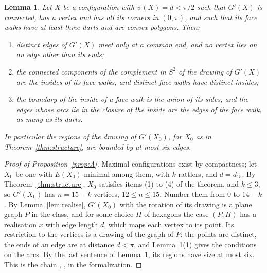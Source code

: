 \documentclass[12pt]{amsart}
\newtheorem{lemma}[theorem]{Lemma}
\theoremstyle{definition}
\theoremstyle{plain}
\theoremstyle{definition}
\newcommand{\Sph}{S^2}
\newcommand{\leanmap}[1]{\ignorespaces}
\newcommand{\mapnote}[1]{\ignorespaces}
\begin{document}
\begin{lemma}\label{lem:regions}\leanmap{Tammes15.D2Regions.regions_eq_facePolygons, Tammes15.D2Regions.isArcDrawing_of_contact, Tammes15.D2Regions.planeClass_of_structured, Tammes15.D2Regions.IsArcDrawing, Tammes15.D2Regions.IsRegion, Tammes15.D2Regions.Bounds, Tammes15.D2Regions.regionSize, Tammes15.D2Regions.facePolygon}\mapnote{for the vertex set of $G'(X)$, whose contact graph is $G'(X)$; the last sentence is the third declaration}
Let $X$ be a configuration with $\psi(X)=d<\pi/2$ such that $G'(X)$ is connected, has a vertex and has all its corners in $(0,\pi)$, and such that its face walks have at least three darts and are convex polygons. Then:
\begin{enumerate}
\item distinct edges of $G'(X)$ meet only at a common end, and no vertex lies on an edge other than its ends;
\item the connected components of the complement in $\Sph$ of the drawing of $G'(X)$ are the insides of its face walks, and distinct face walks have distinct insides;
\item the boundary of the inside of a face walk is the union of its sides, and the edges whose arcs lie in the closure of the inside are the edges of the face walk, as many as its darts.
\end{enumerate}
In particular the regions of the drawing of $G'(X_0)$, for $X_0$ as in Theorem~\ref{thm:structure}, are bounded by at most six edges.
\end{lemma}

\begin{proof}[Proof of Proposition~\ref{prop:A}]
Maximal configurations exist by compactness; let $X_0$ be one with $E(X_0)$ minimal among them, with $k$ rattlers, and $d=d_{15}$. By Theorem~\ref{thm:structure}, $X_0$ satisfies items (1) to (4) of the theorem, and $k\le3$, so $G'(X_0)$ has $n=15-k$ vertices, $12\le n\le15$. Number them from $0$ to $14-k$. By Lemma~\ref{lem:realise}, $G'(X_0)$ with the rotation of its drawing is a plane graph $P$ in the class, and for some choice $H$ of hexagons the case $(P,H)$ has a realisation $x$ with edge length $d$, which maps each vertex to its point. Its restriction to the vertices is a drawing of the graph of $P$: the points are distinct, the ends of an edge are at distance $d<\pi$, and Lemma~\ref{lem:regions}(1) gives the conditions on the arcs. By the last sentence of Lemma~\ref{lem:regions}, its regions have size at most six. This is the chain , ,  in the formalization.
\end{proof}
\end{document}
